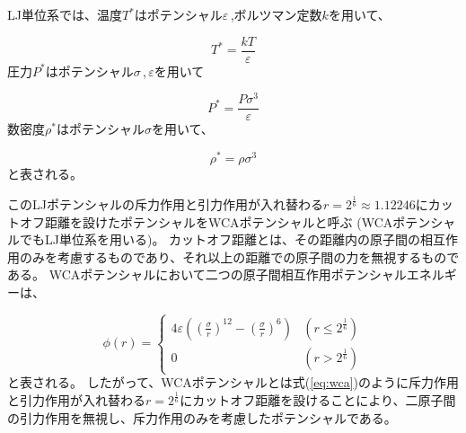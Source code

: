 \documentclass[titlepage]{jsreport}
\begin{document}
LJ単位系では、温度$T^*$はポテンシャル$\varepsilon$\,,ボルツマン定数$k$を用いて、

\large
\begin{equation}
T^*=\frac{kT}{\varepsilon}\label{eq:T}
\end{equation}
\normalsize
圧力$P^*$はポテンシャル${\sigma}$\,,\,${\varepsilon}$を用いて

\large
\begin{equation}
P^*=\frac{P\sigma^3}{\varepsilon}\label{eq:P}
\end{equation}
\normalsize
数密度$\rho^*$はポテンシャル$\sigma$を用いて、

\large
\begin{equation}
\rho^*=\rho{\sigma}^3\label{eq:rho}
\end{equation}
\normalsize
と表される。

このLJポテンシャルの斥力作用と引力作用が入れ替わる$r=2^{\frac{1}{6}}{\approx}1.12246$にカットオフ距離を設けたポテンシャルをWCAポテンシャルと呼ぶ
(WCAポテンシャルでもLJ単位系を用いる)。
カットオフ距離とは、その距離内の原子間の相互作用のみを考慮するものであり、それ以上の距離での原子間の力を無視するものである\cite{WATANABE20191}。
WCAポテンシャルにおいて二つの原子間相互作用ポテンシャルエネルギーは、

\large
\begin{equation}
\phi(r) = \left\{ \begin{array}{ll}
    4{\varepsilon}\left(\left(\frac{\sigma}{r}\right)^{12}-\left(\frac{\sigma}{r}\right)^6\right) & (r\leq2^{\frac{1}{6}}) \\
    0 & (r>2^{\frac{1}{6}})\label{eq:wca}
\end{array} \right.
\end{equation}
\normalsize
と表される\cite{doi:10.1063/1.2176675}。
したがって、WCAポテンシャルとは式(\ref{eq:wca})のように斥力作用と引力作用が入れ替わる$r=2^{\frac{1}{6}}$にカットオフ距離を設けることにより、二原子間の引力作用を無視し、斥力作用のみを考慮したポテンシャルである。
\end{document}
